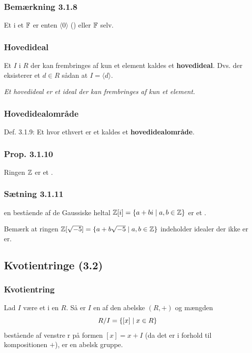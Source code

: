 \subsubsection{Bemærkning 3.1.8}
\label{Bemaerkning 3.1.8}
Et  i et  $\mathbb{F}$ er enten $\langle 0 \rangle$
() eller $\mathbb{F}$ selv.

\subsubsection{Hovedideal}
\label{Hovedideal}
Et  $I$ i $R$ der kan frembringes af kun et element kaldes et
\textbf{hovedideal}. Dvs. der eksisterer et $d \in R$ sådan at $I = \langle d
\rangle$.

\textit{Et hovedideal er et ideal der kan frembringes af kun et element.}

\subsubsection{Hovedidealområde}
\label{Hovedidealomraade}
Def. 3.1.9: Et  hvor ethvert  er et
 kaldes et \textbf{hovedidealområde}.

\subsubsection{Prop. 3.1.10}
\label{Prop. 3.1.10}
Ringen $\mathbb{Z}$ er et .

\subsubsection{Sætning 3.1.11}
\label{Saetning 3.1.11}
en bestående af de Gaussiske heltal $\mathbb{Z}[i] = \{ a + bi \mid
a,b \in \mathbb{Z} \}$ er et .

Bemærk at ringen $\mathbb{Z}[\sqrt{-5}] = \{ a + b\sqrt{-5} \mid a,b \in \mathbb{Z} \}$
indeholder idealer der ikke er er.

\subsection{Kvotientringe (3.2)}
\subsubsection{Kvotientring}
\label{Kvotientring}
Lad $I$ være et  i en  $R$. Så er $I$ en
 af den abelske  $(R, +)$ og mængden 
\begin{equation*}
  R/I = \{ [x] \mid x \in R \}
\end{equation*}
bestående af venstre r på formen $[x] = x +
I$ (da det er i forhold til kompositionen $+$), er en abelsk gruppe.

